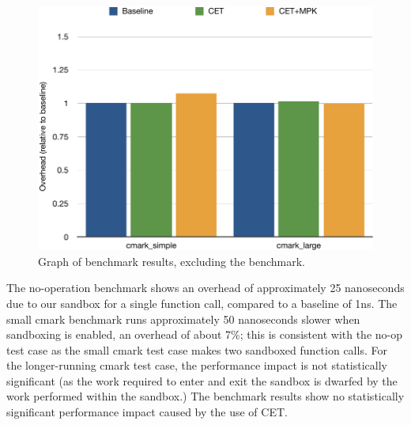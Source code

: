 \begin{figure}[ht]
    \includegraphics[width=\textwidth]{fig/graph2}
    \caption{Graph of benchmark results, excluding the  benchmark.}
    \label{f:graph2}
\end{figure}

The no-operation benchmark shows an overhead of approximately 25 nanoseconds due to our sandbox for
a single function call, compared to a baseline of 1ns. The small cmark benchmark runs approximately
50 nanoseconds slower when sandboxing is enabled, an overhead of about 7\%; this is consistent with
the no-op test case as the small cmark test case makes two sandboxed function calls. For the
longer-running cmark test case, the performance impact is not statistically significant (as the work
required to enter and exit the sandbox is dwarfed by the work performed within the sandbox.) The
benchmark results show no statistically significant performance impact caused by the use of CET. 
